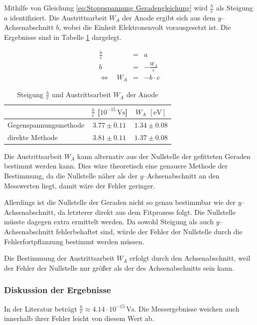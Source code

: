 \documentclass[12pt,a4paper]{scrartcl}
\numberwithin{equation}{section} %
\begin{document}
Mithilfe von Gleichung \eqref{eq:Stoppspannung Geradengleichung} wird $\frac{h}{e}$ als Steigung $a$ identifiziert. Die Austrittsarbeit $W_A$ der Anode ergibt sich aus dem $y$--Achsenabschnitt $b$, wobei die Einheit Elektronenvolt vorausgesetzt ist. Die Ergebnisse sind in Tabelle \ref{table:Ergebnisse Energie} dargelegt.

\begin{eqnarray}
	\frac{h}{e} &=& a \label{eq:h/e Steigung} \\
	b &=& - \frac{W_A}{e} \label{eq:h/e Achsenabschnitt} \\
	\Leftrightarrow \quad W_A &=& - b \cdot e
\end{eqnarray}

\begin{table}[h!]
	\centering
	\begin{tabular}{l|c|c}
		& $\frac{h}{e}$ [$10^{-15} \mathrm{\, Vs}$] & $W_A$ $[\mathrm{eV}]$ \\
		\hline
		Gegenspannungsmethode & $3.77 \pm 0.11$ & $1.34 \pm 0.08$ \\
		direkte Methode & $3.81 \pm 0.11$ & $1.37 \pm 0.08$
	\end{tabular}
	\caption{Steigung $\frac{h}{e}$ und Austrittsarbeit $W_A$ der Anode}
	\label{table:Ergebnisse Energie}
\end{table}

\noindent
Die Austrittsarbeit $W_A$ kann alternativ aus der Nullstelle der gefitteten Geraden bestimmt werden kann. Dies wäre theoretisch eine genauere Methode der Bestimmung, da die Nullstelle näher als der $y$--Achsenabschnitt an den Messwerten liegt, damit wäre der Fehler geringer.

Allerdings ist die Nullstelle der Geraden nicht so genau bestimmbar wie der $y$--Achsenabschnitt, da letzterer direkt aus dem Fitprozess folgt. Die Nullstelle müsste dagegen extra ermittelt werden. Da sowohl Steigung als auch $y$--Achsenabschnitt fehlerbehaftet sind, würde der Fehler der Nullstelle durch die Fehlerfortpflanzung bestimmt werden müssen.

Die Bestimmung der Austrittsarbeit $W_A$ erfolgt durch den Achsenabschnitt, weil der Fehler der Nullstelle nur größer als der des Achsenabschnitts sein kann.

\subsubsection{Diskussion der Ergebnisse}
In der Literatur beträgt $\frac{h}{e}\approx4.14 \cdot 10^{-15} \mathrm{\, Vs}$. \cite{Gerthsen} Die Messergebnisse weichen auch innerhalb ihrer Fehler leicht von diesem Wert ab.
\end{document}
